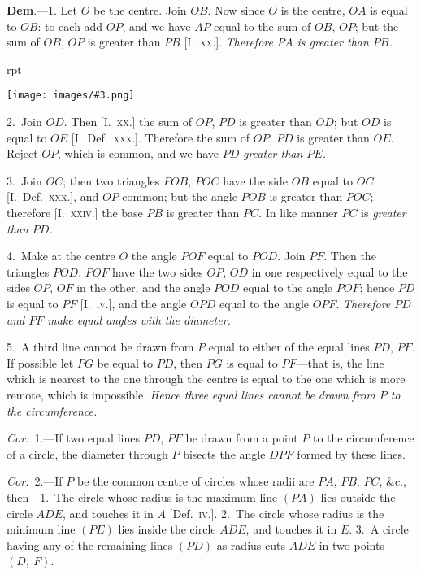 \documentclass[oneside]{book}
\newcounter{wrapwidth}
\newcommand\imgflow[3]{
\setcounter{wrapwidth}{#1}
\begin{wrapfigure}[#2]{r}{\value{wrapwidth}pt}
\begin{center}
\vspace{-0.3in}
\texttt{[image: images/\#3.png]}
\end{center}
\end{wrapfigure}
}
\begin{document}
\textbf{Dem}.---1. Let $O$ be the centre. Join $OB$. Now
since $O$ is the centre, $OA$ is
equal to $OB$: to each add $OP$,
and we have $AP$ equal to the
sum of $OB$, $OP$; but the sum
of $OB$, $OP$ is greater than
$PB$ [I.\ \textsc{xx}.]. \emph{Therefore $PA$ is
greater than $PB$.}

\imgflow{127}{12}{f110}

2.~Join $OD$. Then [I.\ \textsc{xx}.]
the sum of $OP$, $PD$ is greater
than $OD$; but $OD$ is equal to
$OE$ [I.\ Def.\ \textsc{xxx}.]. Therefore
the sum of $OP$, $PD$ is greater than $OE$. Reject $OP$,
which is common, and we have $PD$ \emph{greater than $PE$.}

3.~Join $OC$; then two triangles $POB$, $POC$ have
the side $OB$ equal to $OC$ [I.\ Def.\ \textsc{xxx}.], and $OP$ common;
but the angle $POB$ is greater than $POC$; therefore
[I.\ \textsc{xxiv}.] the base $PB$ is greater than $PC$. In
like manner $PC$ is \emph{greater than $PD$.}

4.~Make at the centre $O$ the angle $POF$ equal to
$POD$. Join $PF$. Then the triangles $POD$, $POF$ have
the two sides $OP$, $OD$ in one respectively equal to the
sides $OP$, $OF$ in the other, and the angle $POD$ equal to
the angle $POF$; hence $PD$ is equal to $PF$ [I.\ \textsc{iv.}], and
the angle $OPD$ equal to the angle $OPF$. \emph{Therefore $PD$
and $PF$ make equal angles with the diameter.}

5.~A third line cannot be drawn from $P$ equal to
either of the equal lines $PD$, $PF$. If possible let $PG$
be equal to $PD$, then $PG$ is equal to $PF$---that is, the
line which is nearest to the one through the centre is
equal to the one which is more remote, which is impossible.
\emph{Hence three equal lines cannot be drawn from
$P$ to the circumference.}

\textit{Cor.}~1.---If two equal lines $PD$, $PF$ be drawn from
a point $P$ to the circumference of a circle, the diameter
through $P$ bisects the angle $DPF$ formed by these
lines.

\textit{Cor.}~2.---If $P$ be the common centre of circles whose
radii are $PA$, $PB$, $PC$, \&c., then---1.\ The circle whose
radius is the maximum line $(PA)$ lies outside the circle
$ADE$, and touches it in $A$ [Def.\ \textsc{iv.}]. 2.~The circle
whose radius is the minimum line $(PE)$ lies inside the
circle $ADE$, and touches it in $E$. 3.~A circle having
any of the remaining lines $(PD)$ as radius cuts $ADE$
in two points $(D,\ F)$.\par\medskip
\end{document}
